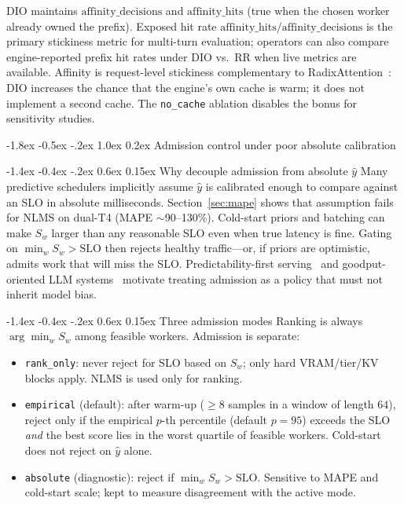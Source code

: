 \documentclass[pdflatex,sn-mathphys-num]{sn-jnl}
\makeatletter
\renewcommand{\section}{\@startsection{section}{1}{\z@}%
  {-1.8ex \@plus -0.5ex \@minus -.2ex}%
  {1.0ex \@plus 0.2ex}%
  {\normalfont\large\bfseries}}%
\renewcommand{\subsection}{\@startsection{subsection}{2}{\z@}%
  {-1.4ex \@plus -0.4ex \@minus -.2ex}%
  {0.6ex \@plus 0.15ex}%
  {\normalfont\normalsize\bfseries}}%
\makeatother
\begin{document}
DIO maintains $\mathrm{affinity\_decisions}$ and $\mathrm{affinity\_hits}$ (true when
the chosen worker already owned the prefix). Exposed hit rate
$\mathrm{affinity\_hits}/\mathrm{affinity\_decisions}$ is the primary stickiness
metric for multi-turn evaluation; operators can also compare engine-reported prefix
hit rates under DIO vs.\ RR when live metrics are available. Affinity is
request-level stickiness complementary to RadixAttention~\cite{radixattention}: DIO
increases the chance that the engine's own cache is warm; it does not implement a
second cache. The \texttt{no\_cache} ablation disables the bonus for sensitivity
studies.

\section{Admission control under poor absolute calibration}
\label{sec:admission}

\subsection{\texorpdfstring{Why decouple admission from absolute $\hat{y}$}{Why decouple admission from absolute latency}}
Many predictive schedulers implicitly assume $\hat{y}$ is calibrated enough to
compare against an SLO in absolute milliseconds. Section~\ref{sec:mape} shows that
assumption fails for NLMS on dual-T4 (MAPE $\sim$90--130\%). Cold-start priors and
batching can make $S_w$ larger than any reasonable SLO even when true latency is
fine. Gating on $\min_w S_w > \mathrm{SLO}$ then rejects healthy traffic---or, if
priors are optimistic, admits work that will miss the SLO. Predictability-first
serving~\cite{clockwork} and goodput-oriented LLM systems~\cite{distserve,sloawarellm}
motivate treating admission as a policy that must not inherit model bias.

\subsection{Three admission modes}
Ranking is always $\arg\min_w S_w$ among feasible workers. Admission is separate:

\begin{itemize}
\item \texttt{rank\_only}: never reject for SLO based on $S_w$; only hard
VRAM/tier/KV blocks apply. NLMS is used only for ranking.
\item \texttt{empirical} (default): after warm-up ($\ge 8$ samples in a window of
length $64$), reject only if the empirical $p$-th percentile (default $p{=}95$)
exceeds the SLO \emph{and} the best score lies in the worst quartile of feasible
workers. Cold-start does not reject on $\hat{y}$ alone.
\item \texttt{absolute} (diagnostic): reject if $\min_w S_w > \mathrm{SLO}$.
Sensitive to MAPE and cold-start scale; kept to measure disagreement with the
active mode.
\end{itemize}
\end{document}
